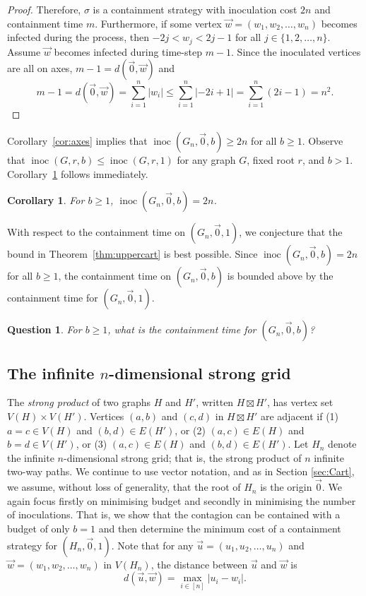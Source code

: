 \documentclass[unknownkeysallowed]{article}
\newtheorem{corollary}[theorem]{Corollary}
\newtheorem{ques}[theorem]{Question}
\theoremstyle{definition}\newtheorem{strategy}{Strategy}
\theoremstyle{definition}\newtheorem{notation}{Notation}[theorem]
\DeclareMathOperator{\inoc}{inoc}
\begin{document}
\begin{proof}
 Therefore, $\sigma$ is a containment strategy with inoculation cost $2n$ and containment time $m$.   Furthermore, if some vertex $\vec{w}=(w_1,w_2,\dots,w_n)$ becomes infected during the process, then $-2j < w_j < 2j-1$ for all $j \in \{1,2,\dots,n\}$. 
Assume $\vec{w}$ becomes infected during time-step $m-1$.  Since the inoculated vertices are all on axes, $m-1 = d(\vec{0},\vec{w})$ and $$ m-1 = d(\vec{0},\vec{w}) = \sum_{i=1}^n |w_i| \leq \sum_{i=1}^n |-2i+1| = \sum_{i=1}^n (2i-1) = n^2.$$
\end{proof}

 Corollary~\ref{cor:axes} implies that $\inoc(G_n,\vec{0},b) \geq 2n$ for all $b \geq 1$.  Observe that $\inoc(G,r,b) \leq \inoc(G,r,1)$ for any graph $G$, fixed root $r$, and $b>1$. Corollary~\ref{cor:cartb} follows immediately.

\begin{corollary}\label{cor:cartb} For $b\geq 1$, $\inoc(G_n,\vec{0},b) =2n$. \end{corollary} 

With respect to the containment time on $(G_n,\vec{0},1)$, we conjecture that the bound in Theorem~\ref{thm:uppercart} is best possible.  Since $\inoc(G_n,\vec{0},b)=2n$ for all $b \geq 1$, the containment time on $(G_n,\vec{0},b)$ is bounded above by the containment time for $(G_n,\vec{0},1)$. 

\begin{ques}For $b\geq 1$, what is the containment time for $(G_n,\vec{0},b)$?
\end{ques}




 \subsection{The infinite $n$-dimensional strong grid}

The \emph{strong product} of two graphs $H$ and $H'$, written $H \boxtimes H'$, has vertex set $V(H) \times V(H')$. Vertices $(a, b)$ and $(c, d)$ in $H \boxtimes H'$ are adjacent if (1) $a = c \in V(H)$ and
$(b,d) \in E(H')$, or (2) $(a,c) \in E(H)$ and $b = d \in V(H')$, or (3) $(a,c) \in E(H)$ and $(b,d) \in E(H')$. Let $H_n$ denote the infinite $n$-dimensional strong grid; that is, the strong product of $n$ infinite two-way paths. We continue to use vector notation, and as in Section \ref{sec:Cart}, we assume, without loss of generality, that the root of $H_n$ is the origin $\vec{0}$. We again focus firstly on minimising budget and secondly in minimising the number of inoculations. That is, we show that the contagion can be contained with a budget of only $b=1$ and then determine the minimum cost of a containment strategy for $(H_n,\vec{0},1)$.
Note that for any $\vec{u} = (u_1,u_2,\dots,u_n)$ and $\vec{w} = (w_1,w_2,\dots,w_n)$ in $V(H_n)$, the distance between $\vec{u}$ and $\vec{w}$ is $$d(\vec{u},\vec{w}) = \max_{i \in [n]}|u_i-w_i|.$$ 
\end{document}
